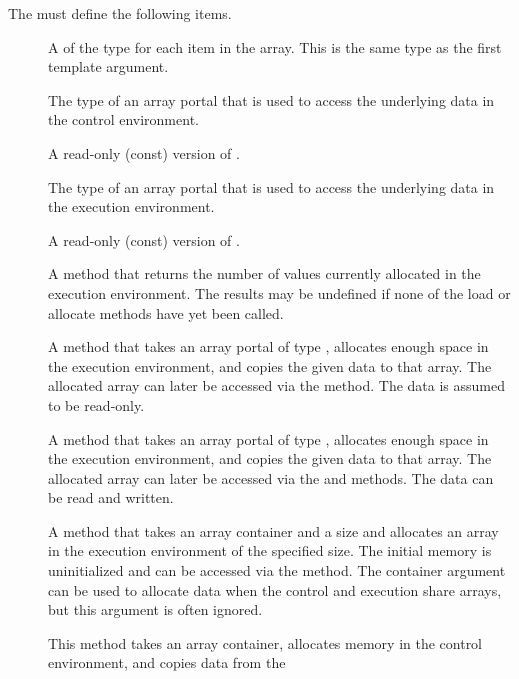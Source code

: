 The  must define the following items.
\begin{description}
\item[] A  of the type for each item
  in the array. This is the same type as the first template argument.
\item[] The type of an array portal that is used to
  access the underlying data in the control environment.
\item[] A read-only (const) version of
  .
\item[] The type of an array portal that is used
  to access the underlying data in the execution environment.
\item[] A read-only (const) version of
  .
\item[] A method that returns the number of
  values currently allocated in the execution environment. The results may
  be undefined if none of the load or allocate methods have yet been
  called.
\item[] A method that takes an array portal of
  type , allocates enough space in the
  execution environment, and copies the given data to that array. The
  allocated array can later be accessed via the
   method. The data is assumed to be
  read-only.
\item[] A method that takes an array portal of
  type , allocates enough space in the execution
  environment, and copies the given data to that array. The allocated array
  can later be accessed via the  and
   methods. The data can be read and
  written.
\item[] A method that takes an array
  container and a size and allocates an array in the execution environment
  of the specified size. The initial memory is uninitialized and can be
  accessed via the  method. The container
  argument can be used to allocate data when the control and execution
  share arrays, but this argument is often ignored.
\item[] This method takes an array container,
  allocates memory in the control environment, and copies data from the

\end{description}
